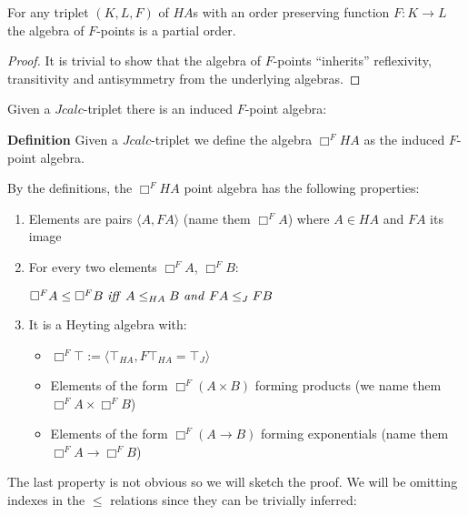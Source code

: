 \begin{theorem}
    For any triplet $(K, L, F)$ of $HA$s with an order 
    preserving function $F:K\rightarrow L$
    the algebra of $F$-points is a partial order.
\end{theorem}
\begin{proof}
    It is trivial to show that the algebra of $F$-points ``inherits'' reflexivity, 
    transitivity and antisymmetry from the underlying algebras.
\end{proof}

Given a $Jcalc$-triplet there is an induced $F$-point algebra:
\begin{mdframed}
    \textbf{Definition}
    Given a $Jcalc$-triplet we define the algebra  $\Box^{F}HA$ as the induced $F$-point algebra.
\end{mdframed}
By the definitions, the $\Box^{F}HA$ point algebra has the following properties:
\begin{enumerate}
    \item Elements are pairs $\langle A, FA\rangle$ (name them $\Box^{F}A$) where $A\in HA$ and $FA$ its image
    \item For every two elements $\Box^{F}A$, $\Box^{F}B$:

    $\Box^{F}A \le\Box^{F}B \text{ \textit{iff} } A\le_{HA}B 
    \text{ \textit{and} } FA\le_J FB $ 
    
    \item It is a Heyting algebra with:
    \begin{itemize}
        \item $\Box^F\top := \langle \top_{HA}, F\top_{HA}=\top_J \rangle$ 
        \item Elements of the form $\Box^F (A \times B)$ 
        forming products (we name them $\Box^F A\times \Box^F B$)
        \item Elements of the form $\Box^F ( A\rightarrow B)$ 
        forming exponentials (name them $\Box^F{A}\rightarrow \Box^F B$)
    \end{itemize}
\end{enumerate}
The last property is not obvious so we will sketch the proof. We will be
omitting indexes in the $\le$ relations since they can be trivially inferred:
\begin{theorem}
\end{theorem}
